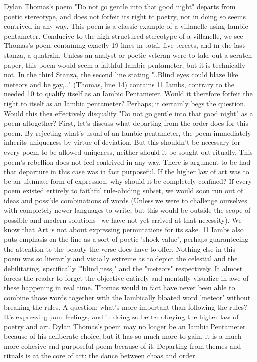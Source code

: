 \markdownRendererDocumentBegin
Dylan Thomas's poem "Do not go gentle into that good night" departs from poetic stereotype, and does not forfeit its right to poetry, nor in doing so seems contrived in any way.\markdownRendererInterblockSeparator
{}This poem is a classic example of a villanelle using Iambic pentameter. Conducive to the high structured stereotype of a villanelle, we see Thomas's poem containing exactly 19 lines in total, five tercets, and in the last stanza, a quatrain. \markdownRendererInterblockSeparator
{}Unless an analyst or poetic veteran were to take out a scratch paper, this poem would seem a faithful Iambic pentameter, but it is technically not. In the third Stanza, the second line stating "..Blind eyes could blaze like meteors and be gay,.." (Thomas, line 14) contains 11 Iambs, contrary to the needed 10 to qualify itself as an Iambic Pentameter. Would it therefore forfeit the right to itself as an Iambic pentameter? Perhaps; it certainly begs the question. Would this then effectively disqualify "Do not go gentle into that good night" as a poem altogether?\markdownRendererInterblockSeparator
{}First, let's discuss what departing from the order does for this poem. By rejecting what's usual of an Iambic pentameter, the poem immediately inherits uniqueness by virtue of deviation. But this shouldn't be necessary for every poem to be allowed uniqeness, neither should it be sought out ritually. This poem's rebellion does not feel contrived in any way.\markdownRendererInterblockSeparator
{}There is argument to be had that departure in this case was in fact purposeful. If the higher law of art was to be an ultimate form of expression, why should it be completely confined? If every poem existed entirely to faithful rule-abiding subset, we would soon run out of ideas and possible combinations of words (Unless we were to challenge ourselves with completely newer languages to write, but this would be outside the scope of possible and modern solutions-- we have not yet arrived at that necessity). We know that Art is not about expressing permutations for its sake.\markdownRendererInterblockSeparator
{}11 Iambs also puts emphasis on the line as a sort of poetic 'shock value', perhaps guaranteeing the attention to the beauty the verse does have to offer. Nothing else in this poem was so literarily and visually extreme as to depict the celestial and the debilitating, specifically '"blind[ness]" and the "meteors" respectively. It almost forces the reader to forget the objective entirely and mentally visualize in awe of these happening in real time.\markdownRendererInterblockSeparator
{}Thomas would in fact have never been able to combine those words together with the Iambically bloated word 'meteor' without breaking the rules. A question: what's more important than following the rules? It's expressing your feelings, and in doing so better obeying the higher law of poetry and art. \markdownRendererInterblockSeparator
{}Dylan Thomas's poem may no longer be an Iambic Pentameter because of his deliberate choice, but it has so much more to gain. It is a much more cohesive and purposeful poem because of it. Departing from themes and rituals is at the core of art: the dance between choas and order.\markdownRendererDocumentEnd